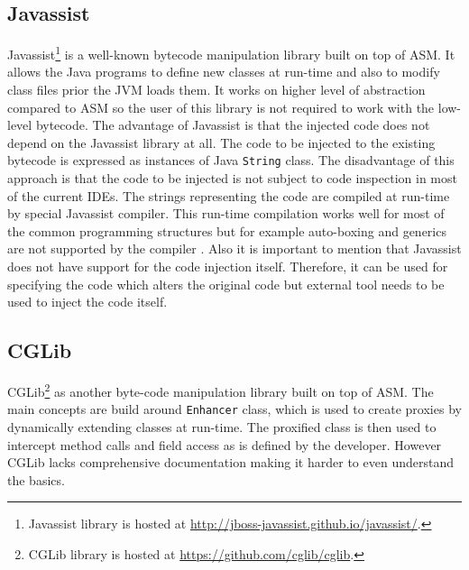 \subsection{Javassist}
\label{javassist}
Javassist\footnote{Javassist library is hosted at \url{http://jboss-javassist.github.io/javassist/}.} is a well-known bytecode manipulation library built on top of ASM. It allows the Java programs to define new classes at run-time and also to modify class files prior the JVM loads them. It works on higher level of abstraction compared to ASM so the user of this library is not required to work with the low-level bytecode. The advantage of Javassist is that the injected code does not depend on the Javassist library at all. The code to be injected to the existing bytecode is expressed as instances of Java \texttt{String} class. The disadvantage of this approach is that the code to be injected is not subject to code inspection in most of the current IDEs. The strings representing the code are compiled at run-time by special Javassist compiler. This run-time compilation works well for most of the common programming structures but for example auto-boxing and generics are not supported by the compiler \cite{JAVASSIST}. Also it is important to mention that Javassist does not have support for the code injection itself. Therefore, it can be used for specifying the code which alters the original code but external tool needs to be used to inject the code itself.
\subsection{CGLib}
\label{cglib}
CGLib\footnote{CGLib library is hosted at \url{https://github.com/cglib/cglib}.} as another byte-code manipulation library built on top of ASM. The main concepts are build around \texttt{Enhancer} class, which is used to create proxies by dynamically extending classes at run-time. The proxified class is then used to intercept method calls and field access as is defined by the developer. However CGLib lacks comprehensive documentation making it harder to even understand the basics.

